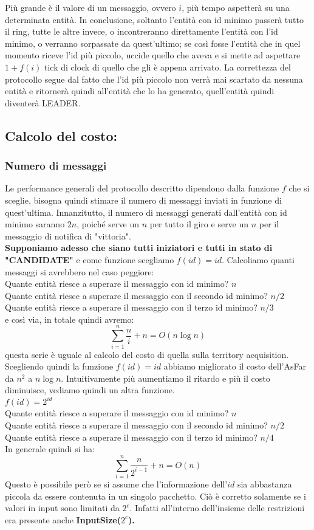 Più grande è il valore di un messaggio, ovvero $i$, più tempo aspetterà su una
determinata entità. In conclusione, soltanto l'entità con id minimo passerà
tutto il ring, tutte le altre invece, o incontreranno direttamente l'entità con
l'id minimo, o verranno sorpassate da quest'ultimo; se così fosse l'entità che
in quel momento riceve l'id più piccolo, uccide quello che aveva e si mette ad
aspettare $1+f(i)$ tick di clock di quello che gli è appena arrivato. La
correttezza del protocollo segue dal fatto che l'id più piccolo non verrà mai
scartato da nessuna entità e ritornerà quindi all'entità che lo ha generato,
quell'entità quindi diventerà LEADER.

\subsection{Calcolo del costo:}
\subsubsection{Numero di messaggi}
Le performance generali del protocollo descritto dipendono dalla funzione $f$
che si sceglie, bisogna quindi stimare il numero di messaggi inviati in funzione
di quest'ultima. Innanzitutto, il numero di messaggi generati dall'entità con id
minimo saranno $2n$, poiché serve un $n$ per tutto il giro e serve un $n$ per il
messaggio di notifica di "vittoria".\\
\textbf{Supponiamo adesso che siano tutti iniziatori e tutti in stato di
    "CANDIDATE"} e come funzione scegliamo \textbf{$f(id) = id$}. Calcoliamo quanti
messaggi si avrebbero nel caso peggiore:\\
Quante entità riesce a superare il messaggio con id minimo? $n$\\
Quante entità riesce a superare il messaggio con il secondo id minimo? $n/2$\\
Quante entità riesce a superare il messaggio con il terzo id minimo? $n/3$\\
e così via, in totale quindi avremo: $$\sum_{i=1}^{n}\frac{n}{i} + n = O(n \log
    n)$$ questa serie è uguale al calcolo del costo di quella sulla territory
acquisition. Scegliendo quindi la funzione $f(id) = id$ abbiamo migliorato il
costo dell'AsFar da $n^2$ a $n \log n$. Intuitivamente più aumentiamo il ritardo
e più il costo diminuisce, vediamo quindi un altra funzione.\\
$f(id) = 2^{id}$\\
Quante entità riesce a superare il messaggio con id minimo? $n$\\
Quante entità riesce a superare il messaggio con il secondo id minimo? $n/2$\\
Quante entità riesce a superare il messaggio con il terzo id minimo? $n/4$\\
In generale quindi si ha:
$$\sum_{i=1}^{n}\frac{n}{2^{i-1}}  +n = O(n)$$ Questo è possibile però se si
assume che l'informazione dell'$id$ sia abbastanza piccola da essere contenuta
in un singolo pacchetto. Ciò è corretto solamente se i valori in input sono
limitati da $2^c$. Infatti all'interno dell'insieme delle restrizioni era
presente anche \textbf{InputSize($2^c$).}\\

